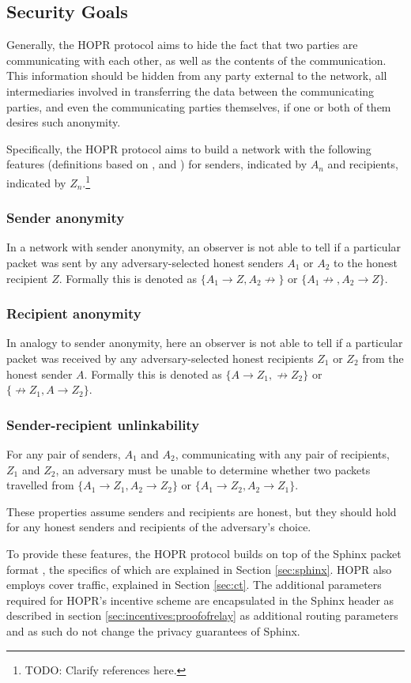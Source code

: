 \subsection{Security Goals}
\label{sec:intro:securitygoals}

Generally, the HOPR protocol aims to hide the fact that two parties are communicating with each other, as well as the contents of the communication. This information should be hidden from any party external to the network, all intermediaries involved in transferring the data between the communicating parties, and even the communicating parties themselves, if one or both of them desires such anonymity.

Specifically, the HOPR protocol aims to build a network with the following features (definitions based on \cite{AnoA}, \cite{loopix} and \cite{sphinxpaper}) for senders, indicated by $A_n$ and recipients, indicated by $Z_n$.\footnote{TODO: Clarify references here.} 

\subsubsection{Sender anonymity}
In a network with sender anonymity, an observer is not able to tell if a particular packet was sent by any adversary-selected honest senders $A_1$ or $A_2$ to the honest recipient $Z$. Formally this is denoted as $\{A_1 \rightarrow Z, A_2 \not\rightarrow \}$ or $\{A_1 \not\rightarrow, A_2 \rightarrow Z \}$.

\subsubsection{Recipient anonymity}
In analogy to sender anonymity, here an observer is not able to tell if a particular packet was received by any adversary-selected honest recipients $Z_1$ or $Z_2$ from the honest sender $A$. Formally this is denoted as $\{A \rightarrow Z_1, \not\rightarrow Z_2 \}$ or $\{\not\rightarrow Z_1, A \rightarrow Z_2 \}$.

\subsubsection{Sender-recipient unlinkability}
For any pair of senders, $A_1$ and $A_2$, communicating with any pair of recipients, $Z_1$ and $Z_2$, an adversary must be unable to determine whether two packets travelled from $\{A_1 \rightarrow Z_1, A_2 \rightarrow Z_2 \}$ or $\{A_1 \rightarrow Z_2, A_2 \rightarrow Z_1 \}$.


These properties assume senders and recipients are honest, but they should hold for any honest senders and recipients of the adversary's choice.

To provide these features, the HOPR protocol builds on top of the Sphinx packet format \cite{sphinxpaper}, the specifics of which are explained in Section \ref{sec:sphinx}. HOPR also employs cover traffic, explained in Section \ref{sec:ct}. The additional parameters required for HOPR's incentive scheme are encapsulated in the Sphinx header as described in section \ref{sec:incentives:proofofrelay} as additional routing parameters and as such do not change the privacy guarantees of Sphinx.

